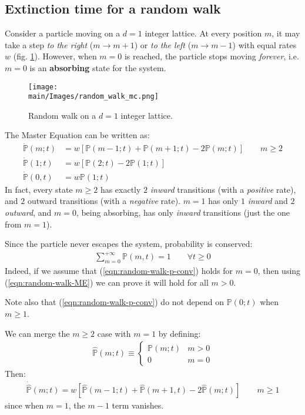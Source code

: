 \documentclass[../../main.tex]{subfiles}
\begin{document}
\subsection{Extinction time for a random walk} %
Consider a particle moving on a $d=1$ integer lattice. At every position $m$, it may take a step \textit{to the right} ($m \to m+1$) or \textit{to the left} ($m \to m-1$) with equal rates $w$ (fig. \ref{fig:random_walk_mc}). However, when $m=0$ is reached, the particle stops moving \textit{forever}, i.e. $m=0$ is an \textbf{absorbing} state for the system.

\begin{figure}[H]
    \centering
    \texttt{[image: \\main/Images/random\_walk\_mc.png]}
    \caption{Random walk on a $d=1$ integer lattice.}
    \label{fig:random_walk_mc}
\end{figure}

The Master Equation can be written as:
\begin{align}\label{eqn:random-walk-ME}
    \dot{\mathbb{P}}(m;t) &= w[\mathbb{P}(m-1;t) + \mathbb{P}(m+1;t) - 2 \mathbb{P}(m;t)] \qquad m \geq 2\\ \nonumber
    \dot{\mathbb{P}}(1;t) &= w[\mathbb{P}(2;t) - 2\mathbb{P}(1;t)]\\ \nonumber
    \dot{\mathbb{P}}(0,t) &= w \mathbb{P}(1;t)
\end{align}
In fact, every state $m \geq 2$ has exactly $2$ \textit{inward} transitions (with a \textit{positive} rate), and $2$ outward transitions (with a \textit{negative} rate). $m=1$ has only $1$ \textit{inward} and $2$ \textit{outward}, and $m=0$, being absorbing, has only \textit{inward} transitions (just the one from $m=1$).

\medskip

Since the particle never escapes the system, probability is conserved:
\begin{align}\label{eqn:random-walk-p-conv}
    \sum_{m=0}^{+\infty} \mathbb{P}(m,t) = 1 \qquad \forall t \geq 0
\end{align}
Indeed, if we assume that (\ref{eqn:random-walk-p-conv}) holds for $m=0$, then using (\ref{eqn:random-walk-ME}) we can prove it will hold for all $m > 0$.

\medskip

Note also that (\ref{eqn:random-walk-p-conv}) do not depend on $\mathbb{P}(0;t)$ when $m \geq 1$. 

\medskip

We can merge the $m \geq 2$ case with $m=1$ by defining:
\begin{align*}
    \hat{\mathbb{P}}(m;t) \equiv \begin{cases}
        \mathbb{P}(m;t) & m > 0\\
        0 & m = 0
    \end{cases}
\end{align*}
Then:
\begin{align}\label{eqn:random-walk-ME2}
    \dot{\hat{\mathbb{P}}}(m;t) = w [\hat{\mathbb{P}}(m-1;t) + \hat{\mathbb{P}}(m+1,t) - 2\hat{\mathbb{P}}(m;t)] \qquad m\geq 1
\end{align}
since when $m = 1$, the $m-1$ term vanishes.
\end{document}
